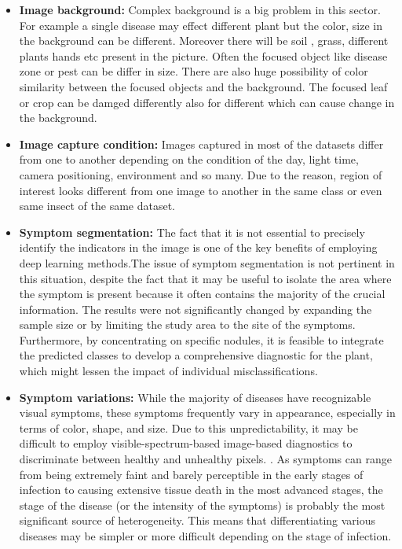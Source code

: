 \begin{itemize}
    \item \textbf{Image background:} Complex background is a big problem in this sector. For example a single disease may effect different plant but the color, size in the background can be different. Moreover there will be soil , grass, different plants hands etc present in the picture. Often the focused object like disease zone or pest can be differ in size. There are also huge possibility of color similarity between the focused objects and the background. The focused leaf or crop can be damged differently also for different which can cause change in the background.
    \item \textbf{Image capture condition:} Images captured in most of the datasets differ from one to another depending on the condition of the day, light time, camera positioning, environment and so many. Due to the reason, region of interest looks different from one image to another in the same class or even same insect of the same dataset.
    \item \textbf{Symptom segmentation:} The fact that it is not essential to precisely identify the indicators in the image is one of the key benefits of employing deep learning methods.The issue of symptom segmentation is not pertinent in this situation, despite the fact that it may be useful to isolate the area where the symptom is present because it often contains the majority of the crucial information. The results were not significantly changed by expanding the sample size or by limiting the study area to the site of the symptoms. Furthermore, by concentrating on specific nodules, it is feasible to integrate the predicted classes to develop a comprehensive diagnostic for the plant, which might lessen the impact of individual misclassifications. 
    \item \textbf{Symptom variations:} While the majority of diseases have recognizable visual symptoms, these symptoms frequently vary in appearance, especially in terms of color, shape, and size. Due to this unpredictability, it may be difficult to employ visible-spectrum-based image-based diagnostics to discriminate between healthy and unhealthy pixels.   \cite{17_barbedo2018factors}. As symptoms can range from being extremely faint and barely perceptible in the early stages of infection to causing extensive tissue death in the most advanced stages, the stage of the disease (or the intensity of the symptoms) is probably the most significant source of heterogeneity. This means that differentiating various diseases may be simpler or more difficult depending on the stage of infection. 

\end{itemize}
